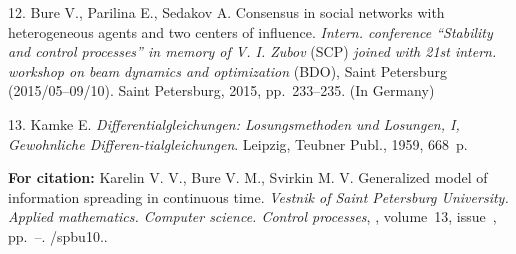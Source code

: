 {12.    Bure V., Parilina E., Sedakov A.  Consensus in social
networks with heterogeneous agents and two centers   of influence.
{\it Intern. conference  ``Stability and control processes'' in
memory of V. I. Zubov} (SCP) {\it joined with 21st intern.
workshop on beam dynamics and optimization} (BDO), Saint
Petersburg (2015/05--09/10). Saint Petersburg, 2015, pp.~233--235.
(In Germany)

13. Kamke E. {\it Differentialgleichungen: Losungsmethoden und
Losungen, I, Gewohnliche Differen-\linebreak tialgleichungen}.
Leipzig, Teubner Publ., 1959, 668~p.




\vskip 2mm

{\bf For citation:} Karelin V. V., Bure V. M., Svirkin M. V.
Generalized model of information spreading in continuous time.
{\it Vestnik of Saint Petersburg University. Applied mathematics.
Computer science. Control processes}, \issueyear, volume~13,
issue~\issuenum, pp.~\pageref{p7}--\pageref{p7e}.
\doivyp/spbu10.\issueyear.


}
